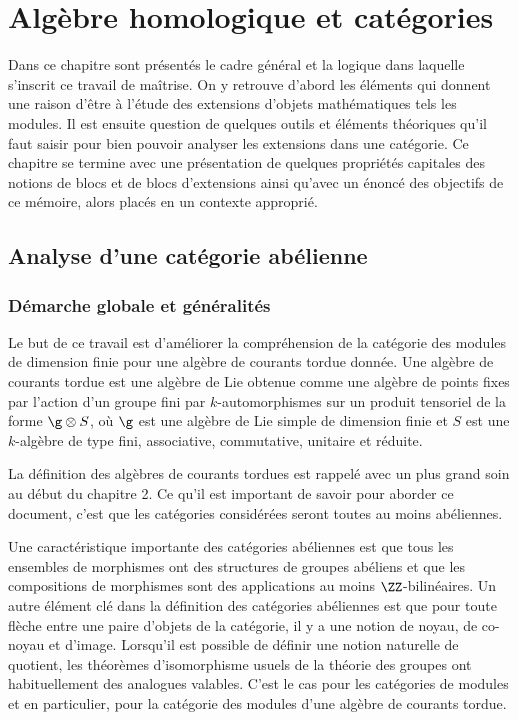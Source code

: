 \chapter{Algèbre homologique et catégories}     %

Dans ce chapitre sont présentés le cadre général et la logique dans laquelle s'inscrit ce travail de maîtrise. On y retrouve d'abord les éléments qui donnent une raison d'être à l'étude des extensions d'objets mathématiques tels les modules. Il est ensuite question de quelques outils et éléments théoriques qu'il faut saisir pour bien pouvoir analyser les extensions dans une catégorie. Ce chapitre se termine avec une présentation de quelques propriétés capitales des notions de blocs et de blocs d'extensions ainsi qu'avec un énoncé des objectifs de ce mémoire, alors placés en un contexte approprié.

\section{Analyse d'une catégorie abélienne}
%
\subsection{Démarche globale et généralités}

Le but de ce travail est d'améliorer la compréhension de la catégorie des modules de dimension finie pour une algèbre de courants tordue donnée. Une algèbre de courants tordue est une algèbre de Lie obtenue comme une algèbre de points fixes par l'action d'un groupe fini par $k$-automorphismes sur un produit tensoriel de la forme $\g \otimes S$, où $\g$ est une algèbre de Lie simple de dimension finie et $S$ est une $k$-algèbre de type fini, associative, commutative, unitaire et réduite. 

La définition des algèbres de courants tordues est rappelé avec un plus grand soin au début du chapitre 2. Ce qu'il est important de savoir pour aborder ce document, c'est que les catégories considérées seront toutes au moins abéliennes. 

Une caractéristique importante des catégories abéliennes est que tous les ensembles de morphismes ont des structures de groupes abéliens et que les compositions de morphismes sont des applications au moins $\ZZ$-bilinéaires. Un autre élément clé dans la définition des catégories abéliennes est que pour toute flèche entre une paire d'objets de la catégorie, il y a une notion de noyau, de co-noyau et d'image. Lorsqu'il est possible de définir une notion naturelle de quotient, les théorèmes d'isomorphisme usuels de la théorie des groupes ont habituellement des analogues valables. C'est le cas pour les catégories de modules et en particulier, pour la catégorie des modules d'une algèbre de courants tordue.

